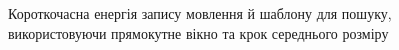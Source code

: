         \begin{figure}[h]
            \centering

            \caption{Короткочасна енергія запису мовлення й шаблону для пошуку, використовуючи прямокутне вікно та крок
                середнього розміру}
            \label{fig:audio-energy-rect-half}
        \end{figure}

